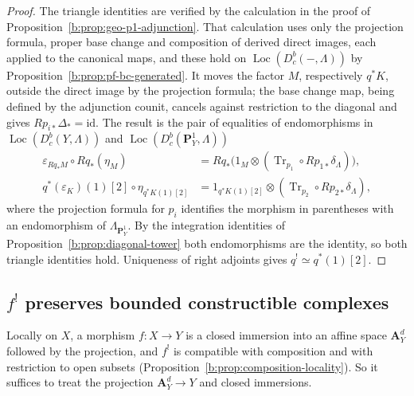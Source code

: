 \documentclass[11pt,a4paper]{article}
\numberwithin{equation}{section}
\theoremstyle{definition}
\theoremstyle{remark}
\newcommand{\Dbc}{D^b_c}
\newcommand{\Loc}{\operatorname{Loc}}
\begin{document}
\begin{proof}
The triangle identities are verified by the calculation in the proof of
Proposition~\ref{b:prop:geo-p1-adjunction}. That calculation uses only
the projection formula, proper base change and composition of derived
direct images, each applied to the canonical maps, and these hold on
$\Loc(\Dbc(-,\Lambda))$ by Proposition~\ref{b:prop:pf-bc-generated}.
It moves the factor $M$, respectively $q^*K$, outside the direct image by
the projection formula; the base change map, being defined by the
adjunction counit, cancels against restriction to the diagonal and gives
$Rp_{i*}\Delta_*=\mathrm{id}$. The result is the pair of equalities of
endomorphisms in $\Loc(\Dbc(Y,\Lambda))$ and
$\Loc(\Dbc(\mathbf P^1_Y,\Lambda))$
\[
\begin{aligned}
 \varepsilon_{Rq_*M}\circ Rq_*(\eta_M)
   &=Rq_*\bigl(1_M\otimes
                   (\operatorname{Tr}_{p_1}\circ Rp_{1*}\delta_\Lambda)\bigr),\\
 q^*(\varepsilon_K)(1)[2]\circ\eta_{q^*K(1)[2]}
   &=1_{q^*K(1)[2]}\otimes(\operatorname{Tr}_{p_2}\circ Rp_{2*}\delta_\Lambda),
\end{aligned}
\]
where the projection formula for $p_i$ identifies the morphism in
parentheses with an endomorphism of $\Lambda_{\mathbf P^1_Y}$. By the
integration identities of Proposition~\ref{b:prop:diagonal-tower} both
endomorphisms are the identity, so both triangle identities hold.
Uniqueness of right adjoints gives $q^!\simeq q^*(1)[2]$.
\end{proof}

\subsection{\texorpdfstring{$f^!$}{f!} preserves bounded constructible complexes}
\label{b:sec:restriction}

Locally on $X$, a morphism
$f:X\to Y$ is a closed immersion into an affine space $\mathbf A^d_Y$
followed by the projection, and $f^!$ is compatible with composition and
with restriction to open subsets
(Proposition~\ref{b:prop:composition-locality}). So it suffices to treat
the projection $\mathbf A^d_Y\to Y$ and closed immersions.
\end{document}
